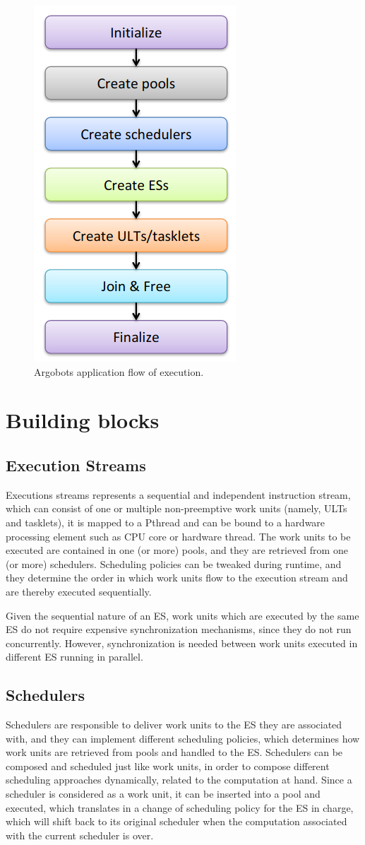 \begin{figure}[H]
    \centering
    \includegraphics[width=0.35\linewidth]{res/control-flow.png}
    \caption{Argobots application flow of execution.}
    \label{fig:ex-flow}
\end{figure}

\section{Building blocks}
\subsection{Execution Streams}
Executions streams represents a sequential and independent instruction stream, which can consist of one or multiple non-preemptive work units (namely, ULTs and tasklets), it is mapped to a Pthread and can be bound to a hardware processing element such as CPU core or hardware thread. The work units to be executed are contained in one (or more) pools, and they are retrieved from one (or more) schedulers. Scheduling policies can be tweaked during runtime, and they determine the order in which work units flow to the execution stream and are thereby executed sequentially.\newline

Given the sequential nature of an ES, work units which are executed by the same ES do not require expensive synchronization mechanisms, since they do not run concurrently. However, synchronization is needed between work units executed in different ES running in parallel. 

\subsection{Schedulers}
Schedulers are responsible to deliver work units to the ES they are associated with, and they can implement different scheduling policies, which determines how work units are retrieved from pools and handled to the ES. Schedulers can be composed and scheduled just like work units, in order to compose different scheduling approaches dynamically, related to the computation at hand. Since a scheduler is considered as a work unit, it can be inserted into a pool and executed, which translates in a change of scheduling policy for the ES in charge, which will shift back to its original scheduler when the computation associated with the current scheduler is over.

